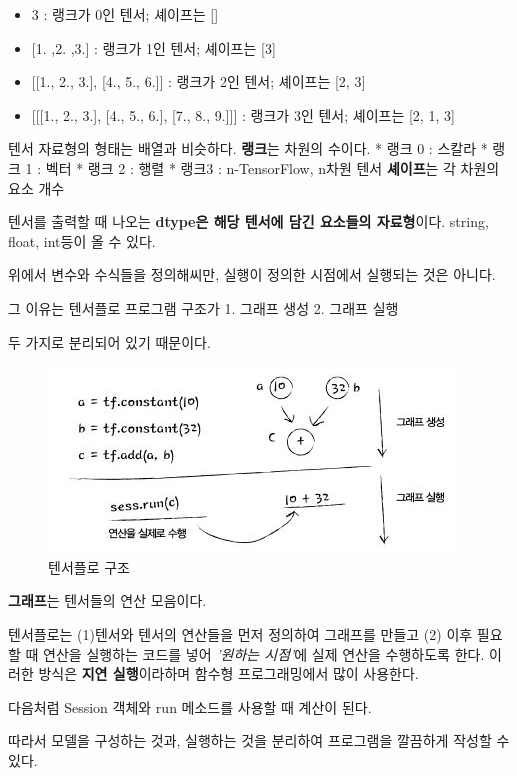 \documentclass[11pt]{article}
\makeatletter
\def\maxwidth{\ifdim\Gin@nat@width>\linewidth\linewidth
    \else\Gin@nat@width\fi}
\let\Oldincludegraphics\includegraphics
\renewcommand{\includegraphics}[1]{\Oldincludegraphics[width=.8\maxwidth]{#1}}
\providecommand{\tightlist}{%
      \setlength{\itemsep}{0pt}\setlength{\parskip}{0pt}}
\makeatother
\begin{document}
\begin{itemize}
\tightlist
\item
  3 : 랭크가 0인 텐서; 셰이프는 {[}{]}
\item
  {[}1. ,2. ,3.{]} : 랭크가 1인 텐서; 셰이프는 {[}3{]}
\item
  {[}{[}1., 2., 3.{]}, {[}4., 5., 6.{]}{]} : 랭크가 2인 텐서; 셰이프는
  {[}2, 3{]}
\item
  {[}{[}{[}1., 2., 3.{]}, {[}4., 5., 6.{]}, {[}7., 8., 9.{]}{]}{]} :
  랭크가 3인 텐서; 셰이프는 {[}2, 1, 3{]}
\end{itemize}

텐서 자료형의 형태는 배열과 비슷하다. \textbf{랭크}는 차원의 수이다. *
랭크 0 : 스칼라 * 랭크 1 : 벡터 * 랭크 2 : 행렬 * 랭크3 : n-TensorFlow,
n차원 텐서 \textbf{셰이프}는 각 차원의 요소 개수

텐서를 출력할 때 나오는 \textbf{dtype은 해당 텐서에 담긴 요소들의
자료형}이다. string, float, int등이 올 수 있다.

위에서 변수와 수식들을 정의해씨만, 실행이 정의한 시점에서 실행되는 것은
아니다.

그 이유는 텐서플로 프로그램 구조가 1. 그래프 생성 2. 그래프 실행

두 가지로 분리되어 있기 때문이다.

\begin{figure}
\centering
\includegraphics{./img/img1.JPG}
\caption{텐서플로 구조}
\end{figure}

\textbf{그래프}는 텐서들의 연산 모음이다.

텐서플로는 (1)텐서와 텐서의 연산들을 먼저 정의하여 그래프를 만들고 (2)
이후 필요할 때 연산을 실행하는 코드를 넣어 \emph{'원하는 시점'}에 실제
연산을 수행하도록 한다. 이러한 방식은 \textbf{지연 실행}이라하며 함수형
프로그래밍에서 많이 사용한다.

다음처럼 Session 객체와 run 메소드를 사용할 때 계산이 된다.

따라서 모델을 구성하는 것과, 실행하는 것을 분리하여 프로그램을 깔끔하게
작성할 수 있다.
\end{document}
